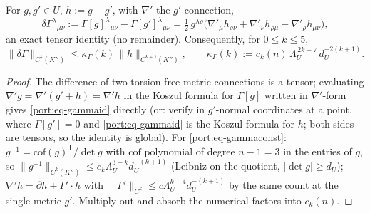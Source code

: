 \begin{lemma}\label{port:lem-gamma}
For $g,g'\in U$, $h:=g-g'$, with $\nabla'$ the $g'$-connection,
\begin{equation}\label{port:eq-gammaid}
  \delta\Gamma^{\lambda}{}_{\mu\nu}
  :=\Gamma[g]^{\lambda}{}_{\mu\nu}-\Gamma[g']^{\lambda}{}_{\mu\nu}
  =\tfrac12\,g^{\lambda\rho}\bigl(\nabla'_{\mu}h_{\rho\nu}
  +\nabla'_{\nu}h_{\rho\mu}-\nabla'_{\rho}h_{\mu\nu}\bigr),
\end{equation}
an exact tensor identity (no remainder). Consequently, for $0\le k\le5$,
\begin{equation}\label{port:eq-gammaconst}
  \|\delta\Gamma\|_{C^k(K'')}\le\kappa_\Gamma(k)\,\|h\|_{C^{k+1}(K'')},
  \qquad
  \kappa_\Gamma(k):=c_k(n)\,\Lambda_U^{\,2k+7}\,d_U^{-2(k+1)} .
\end{equation}
\end{lemma}
\begin{proof}
The difference of two torsion-free metric connections is a tensor;
evaluating $\nabla' g=\nabla' (g'+h)=\nabla' h$ in the Koszul formula
for $\Gamma[g]$ written in $\nabla'$-form gives \eqref{port:eq-gammaid}
directly (or: verify in $g'$-normal coordinates at a point, where
$\Gamma[g']=0$ and \eqref{port:eq-gammaid} is the Koszul formula for
$h$; both sides are tensors, so the identity is global). For
\eqref{port:eq-gammaconst}: $g^{-1}=\mathrm{cof}(g)^{\mathsf T}/\det g$
with $\mathrm{cof}$ polynomial of degree $n-1=3$ in the entries of
$g$, so $\|g^{-1}\|_{C^k(K'')}\le c_k\Lambda_U^{3+k}d_U^{-(k+1)}$
(Leibniz on the quotient, $|\det g|\ge d_U$); $\nabla'h=\partial h+
\Gamma'\!\cdot\!h$ with $\|\Gamma'\|_{C^k}\le c\Lambda_U^{k+4}
d_U^{-(k+1)}$ by the same count at the single metric $g'$. Multiply
out and absorb the numerical factors into $c_k(n)$.
\end{proof}

